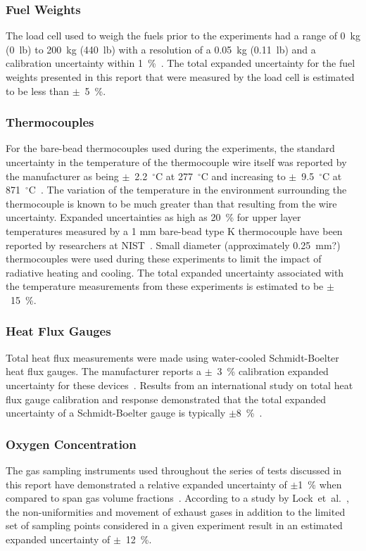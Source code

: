 \documentclass[12pt,oneside]{book}
\begin{document}
\subsubsection*{Fuel Weights}
The load cell used to weigh the fuels prior to the experiments had a range of 0~kg (0~lb) to 200~kg (440~lb) with a resolution of a 0.05~kg (0.11~lb) and a calibration uncertainty within 1~\%~\cite{Ohaus:2000}. The total expanded uncertainty for the fuel weights presented in this report that were measured by the load cell is estimated to be less than $\pm$~5~\%.

\subsubsection*{Thermocouples}
For the bare-bead thermocouples used during the experiments, the standard uncertainty in the temperature of the thermocouple wire itself was reported by the manufacturer as being $\pm$~2.2~$^{\circ}$C at 277~$^{\circ}$C and increasing to $\pm$~9.5~$^{\circ}$C at 871~$^{\circ}$C~\cite{Omega:2004}. The variation of the temperature in the environment surrounding the thermocouple is known to be much greater than that resulting from the wire uncertainty. Expanded uncertainties as high as 20~\% for upper layer temperatures measured by a 1 mm bare-bead type K thermocouple have been reported by researchers at NIST~\cite{Blevins:1999,Pitts:2003}. Small diameter (approximately 0.25~mm?) thermocouples were used during these experiments to limit the impact of radiative heating and cooling. The total expanded uncertainty associated with the temperature measurements from these experiments is estimated to be $\pm$~15~\%.

\subsubsection*{Heat Flux Gauges}
Total heat flux measurements were made using water-cooled Schmidt-Boelter heat flux gauges. The manufacturer reports a $\pm$~3~\% calibration expanded uncertainty for these devices~\cite{Medtherm:2003}. Results from an international study on total heat flux gauge calibration and response demonstrated that the total expanded uncertainty of a Schmidt-Boelter gauge is typically $\pm$8~\%~\cite{Pitts:2006}.

\subsubsection*{Oxygen Concentration}
The gas sampling instruments used throughout the series of tests discussed in this report have demonstrated a relative expanded uncertainty of $\pm$1~\% when compared to span gas volume fractions~\cite{Bundy:2007}. According to a study by Lock~et~al.~\cite{Lock:1}, the non-uniformities and movement of exhaust gases in addition to the limited set of sampling points considered in a given experiment result in an estimated expanded uncertainty of $\pm$~12~\%.
\end{document}

